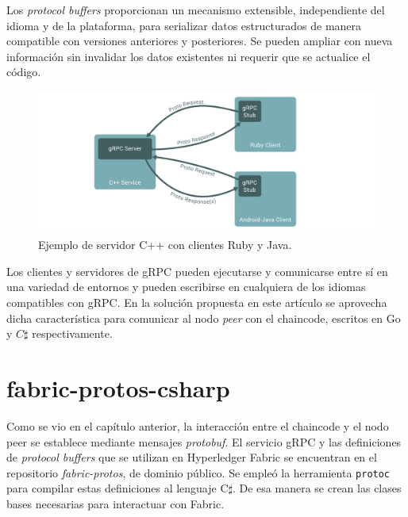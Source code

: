Los \textit{protocol buffers} proporcionan un mecanismo extensible, independiente del idioma y de la plataforma, para serializar datos estructurados de manera compatible con versiones anteriores y posteriores. Se pueden ampliar con nueva información sin invalidar los datos existentes ni requerir que se actualice el código.

\begin{figure}[tbph]
\centering
\includegraphics[width=\textwidth]{Images/grpc}
\caption{ Ejemplo de servidor C++ con clientes Ruby y Java.}
\label{fig:grpc}
\end{figure}

Los clientes y servidores de gRPC pueden ejecutarse y comunicarse entre sí en una variedad de entornos y pueden escribirse en cualquiera de los idiomas compatibles con gRPC. En la solución propuesta en este artículo se aprovecha dicha característica para comunicar al nodo \textit{peer} con el chaincode, escritos en Go y $ C\sharp$ respectivamente.

\section{fabric-protos-csharp}
Como se vio en el capítulo anterior, la interacción entre el chaincode y el nodo peer se establece mediante mensajes \textit{protobuf}. El servicio gRPC y las definiciones de \textit{protocol buffers} que se utilizan en Hyperledger Fabric se encuentran en el repositorio \textit{fabric-protos}, de dominio público. Se empleó la herramienta \texttt{protoc} para compilar estas definiciones al lenguaje C$\sharp$. De esa manera se crean las clases bases necesarias para interactuar con Fabric.

